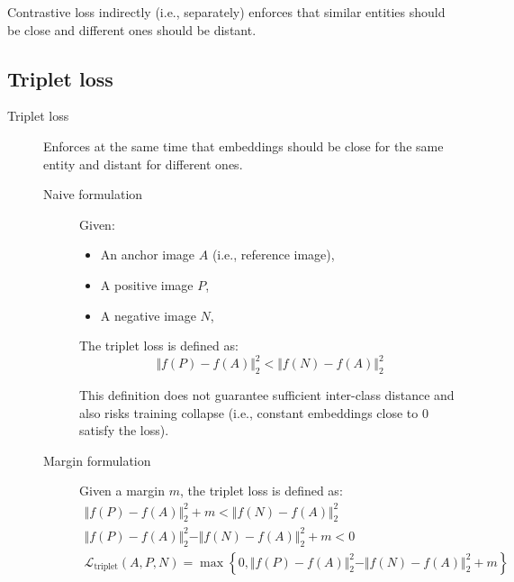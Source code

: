 \begin{remark}
    Contrastive loss indirectly (i.e., separately) enforces that similar entities should be close and different ones should be distant.
\end{remark}


\subsection{Triplet loss} \label{sec:triplet_loss}

\begin{description}
    \item[Triplet loss] 
        Enforces at the same time that embeddings should be close for the same entity and distant for different ones.

        \begin{description}
            \item[Naive formulation] 
                Given:
                \begin{itemize}
                    \item An anchor image $A$ (i.e., reference image),
                    \item A positive image $P$,
                    \item A negative image $N$,
                \end{itemize}
                The triplet loss is defined as:
                \[ \Vert f(P) - f(A) \Vert_2^2 < \Vert f(N) - f(A) \Vert_2^2 \]

                \begin{remark}
                    This definition does not guarantee sufficient inter-class distance and also risks training collapse (i.e., constant embeddings close to 0 satisfy the loss).
                \end{remark}

            \item[Margin formulation] 
                Given a margin $m$, the triplet loss is defined as:
                \[ 
                    \begin{gathered}
                        \Vert f(P) - f(A) \Vert_2^2 + m < \Vert f(N) - f(A) \Vert_2^2 \\
                        \Vert f(P) - f(A) \Vert_2^2 - \Vert f(N) - f(A) \Vert_2^2 + m < 0 \\
                        \mathcal{L}_\text{triplet}(A, P, N) = \max \left\{ 0,  \Vert f(P) - f(A) \Vert_2^2 - \Vert f(N) - f(A) \Vert_2^2 + m \right\}
                    \end{gathered}
                \]


\end{description}
\end{description}
